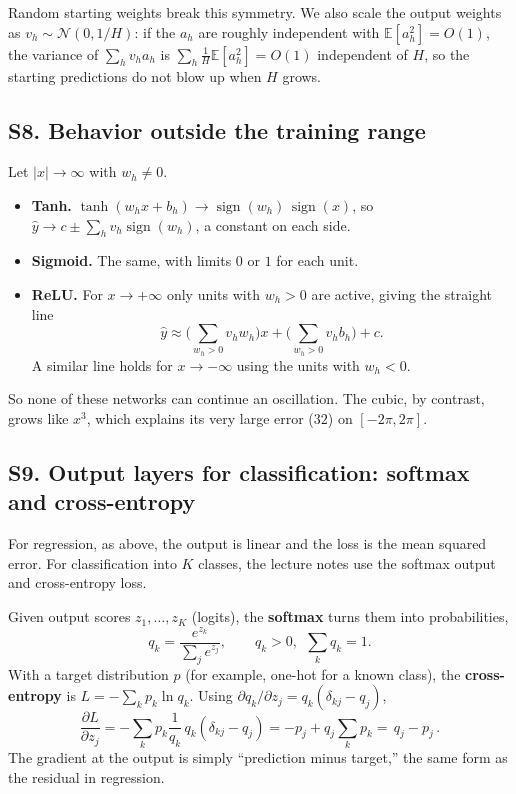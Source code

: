 \documentclass[11pt]{article}
\DeclareMathOperator{\sign}{sign}
\begin{document}
Random starting weights break this symmetry. We also scale the output weights as $v_h\sim\mathcal N(0,1/H)$: if the $a_h$ are roughly independent with $\mathbb E[a_h^2]=O(1)$, the variance of $\sum_hv_ha_h$ is $\sum_h\frac1H\mathbb E[a_h^2]=O(1)$ independent of $H$, so the starting predictions do not blow up when $H$ grows.

\label{sec:S8}
\subsection*{S8. Behavior outside the training range}
Let $|x|\to\infty$ with $w_h\ne0$.
\begin{itemize}[nosep]
  \item \textbf{Tanh.} $\tanh(w_hx+b_h)\to\sign(w_h)\,\sign(x)$, so
  $\hat y\to c\pm\sum_hv_h\sign(w_h)$, a constant on each side.
  \item \textbf{Sigmoid.} The same, with limits $0$ or $1$ for each unit.
  \item \textbf{ReLU.} For $x\to+\infty$ only units with $w_h>0$ are active, giving the straight line
  \[
    \hat y\approx\Big(\sum_{w_h>0}v_hw_h\Big)x+\Big(\sum_{w_h>0}v_hb_h\Big)+c .
  \]
  A similar line holds for $x\to-\infty$ using the units with $w_h<0$.
\end{itemize}
So none of these networks can continue an oscillation. The cubic, by contrast, grows like $x^3$, which explains its very large error ($32$) on $[-2\pi,2\pi]$.

\subsection*{S9. Output layers for classification: softmax and cross-entropy}
For regression, as above, the output is linear and the loss is the mean squared error. For classification into $K$ classes, the lecture notes use the softmax output and cross-entropy loss.

Given output scores $z_1,\dots,z_K$ (logits), the \textbf{softmax} turns them into probabilities,
\[
  q_k=\frac{e^{z_k}}{\sum_je^{z_j}},\qquad q_k>0,\ \ \sum_kq_k=1 .
\]
With a target distribution $p$ (for example, one-hot for a known class), the \textbf{cross-entropy} is $L=-\sum_kp_k\ln q_k$. Using $\partial q_k/\partial z_j=q_k(\delta_{kj}-q_j)$,
\[
  \frac{\partial L}{\partial z_j}
  =-\sum_kp_k\frac{1}{q_k}\,q_k(\delta_{kj}-q_j)
  =-p_j+q_j\sum_kp_k=\boxed{\,q_j-p_j\,}.
\]
The gradient at the output is simply ``prediction minus target,'' the same form as the residual in regression.
\end{document}
